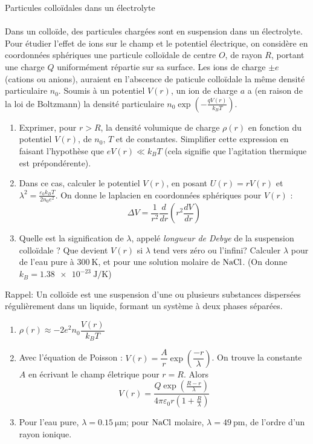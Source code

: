 \documentclass[french, a4paper, 11pt]{article}
\newcommand{\po}{\left(}         %
\newcommand{\pf}{\right)}        %
\newcommand{\pof}[1]{\po #1 \pf} %
\begin{document}
\begin{cadre}{Particules colloïdales dans un électrolyte}
  \paragraph*{}
  Dans un colloïde, des particules chargées sont en suspension dans un électrolyte. Pour étudier l'effet de ions sur le champ et le potentiel électrique, on considère en coordonnées sphériques une particule colloïdale de centre \(O\), de rayon \(R\), portant une charge \(Q\) uniformément répartie sur sa surface.
  Les ions de charge \(\pm e\) (cations ou anions), auraient en l'abscence de paticule colloïdale la même densité particulaire \(n_{0}\). Soumis à un potentiel \(V(r)\), un ion de charge \(a\) a (en raison de la loi de Boltzmann) la densité particulaire \(n_{0}\exp\pof{-\frac{qV(r)}{k_{B}T}}\).
  \begin{enumerate}[label=\upshape\alph*)]
    \item Exprimer, pour \(r>R\), la densité volumique de charge \(\rho(r)\) en fonction du potentiel \(V(r)\), de \(n_0\), \(T\) et de constantes. Simplifier cette expression en faisant l'hypothèse que \(eV(r)\ll k_{B}T\) (cela signifie que l'agitation thermique est prépondérente).
    \item Dans ce cas, calculer le potentiel \(V(r)\), en posant \(U(r) = rV(r)\) et \(\lambda^{2} = \frac{\varepsilon_{0}k_{B}T}{2n_{0}e^{2}}\).
      On donne le laplacien en coordonnées sphériques pour \(V(r)\) :
      \[\Delta V = \dfrac{1}{r^{2}}\dfrac{d}{dr}\pof{r^{2}\dfrac{dV}{dr}}\]
    \item Quelle est la signification de \(\lambda\), appelé \emph{longueur de Debye} de la suspension colloïdale ? Que devient \(V(r)\) si \(\lambda\) tend vers zéro ou l'infini? Calculer \(\lambda\) pour de l'eau pure à \(\SI{300}{\kelvin}\), et pour une solution molaire de \(\ce{NaCl}\). (On donne \(k_{B} = \SI{1.38e-23}{\joule\per\kelvin}\))
  \end{enumerate}
  Rappel: Un colloïde est une suspension d'une ou plusieurs substances dispersées régulièrement dans un liquide, formant un système à deux phases séparées.
  \tcblower
  \begin{enumerate}[label=\upshape\alph*)]
    \item \(\rho(r) \approx -2e^{2}n_{0}\dfrac{V(r)}{k_{B}T}\)
    \item Avec l'équation de Poisson : \(V(r) = \dfrac{A}{r}\exp\pof{\dfrac{-r}{\lambda}}\). On trouve la constante \(A\) en écrivant le champ életrique pour \(r=R\). Alors
      \[V(r) = \dfrac{Q\exp\pof{\frac{R-r}{\lambda}}}{4\pi\varepsilon_{0}r\pof{1+\frac{R}{\lambda}}}\]
    \item Pour l'eau pure, \(\lambda = \SI{0.15}{\micro\meter}\); pour \(\ce{NaCl}\) molaire, \(\lambda=\SI{49}{\pico\meter}\), de l'ordre d'un rayon ionique.
  \end{enumerate}
\end{cadre}
\end{document}
